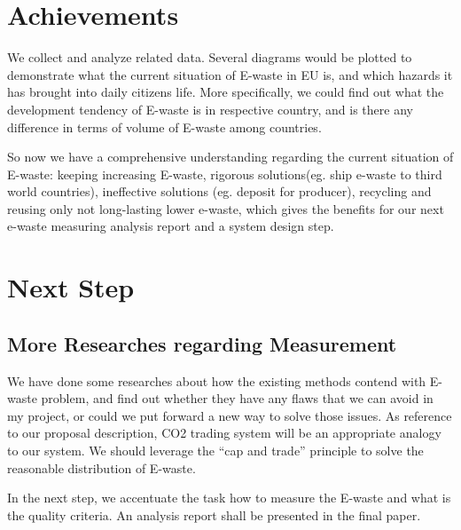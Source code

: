 \documentclass[sigchi-a, authorversion]{acmart}
\begin{document}

\maketitle

\section{Achievements}

We collect and analyze related data. Several diagrams would be plotted to demonstrate
what the current situation of E-waste in EU is, and which hazards it has brought into
daily citizens life. More specifically, we could find out what the development tendency
of E-waste is in respective country, and is there any difference in terms of volume of
E-waste among countries. 

So now we have a comprehensive understanding regarding the current situation of E-waste: 
keeping increasing E-waste, rigorous solutions(eg. ship e-waste to third world 
countries)\cite{Robinson2009}, ineffective solutions (eg. deposit for producer), 
recycling and reusing only not long-lasting lower e-waste\cite{kahhat2008exploring, BMUB},
which gives the benefits for our next e-waste measuring analysis report and a system design step.

\section{Next Step}

\subsection{More Researches regarding Measurement}

We have done some researches about how the existing methods \cite{DUH, NABU} 
contend with E-waste problem, and find out whether they have any flaws that we 
can avoid in my project, or could we put forward a new way to solve those issues.
As reference to our proposal description, CO2 trading system will be an appropriate analogy 
to our system. We should leverage the  ``cap and trade'' principle to solve the 
reasonable distribution of E-waste. 

In the next step, we accentuate the task how to measure the E-waste and what is the quality criteria.
An analysis report shall be presented in the final paper.
\end{document}
